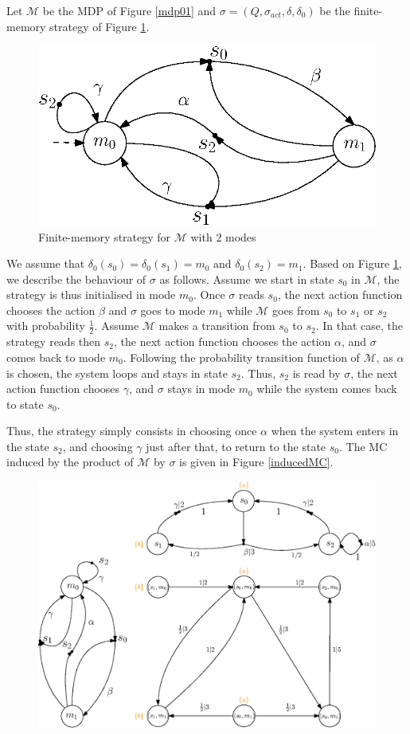 \begin{example}
  Let $\mathcal{M}$ be the MDP of Figure \ref{mdp01} and $\sigma = (Q, \sigma_{act}, \delta, \delta_0)$ be the
  finite-memory strategy of Figure \ref{finite_mem_strat}.
  \begin{figure}[h!]
    \centering
    \includegraphics[width=0.4\linewidth]{resources/strategy}
    \caption{Finite-memory strategy for $\mathcal{M}$ with $2$ modes}\label{finite_mem_strat}
  \end{figure}
  We assume that $\delta_0(s_0) = \delta_0(s_1) = m_0$ and $\delta_0(s_2) = m_1$.
  Based on Figure \ref{finite_mem_strat}, we describe the behaviour of $\sigma$ as follows.
  Assume we start in state $s_0$ in $\mathcal{M}$, the strategy is thus initialised in mode $m_0$.
  Once $\sigma$ reads $s_0$, the next action function chooses the action $\beta$ and $\sigma$ goes to mode $m_1$ while $\mathcal{M}$ goes from $s_0$ to $s_1$ or $s_2$ with probability $\frac{1}{2}$. Assume $\mathcal{M}$ makes a transition from $s_0$ to $s_2$.
  In that case, the strategy reads then $s_2$, the next action function chooses the action $\alpha$, and $\sigma$ comes back to mode $m_0$.
  Following the probability transition function of $\mathcal{M}$, as $\alpha$ is chosen, the system loops and stays in state $s_2$. Thus, $s_2$ is read by $\sigma$, the next action function chooses $\gamma$, and $\sigma$ stays in mode $m_0$ while the system comes back to state $s_0$.
  \par Thus, the strategy simply consists in choosing once $\alpha$ when the system enters in the state $s_2$, and choosing $\gamma$ just after that, to return to the state $s_0$. The MC induced by the product of $\mathcal{M}$ by $\sigma$ is given in Figure
  \ref{inducedMC}.
  \begin{figure}[H]
    \centering
    \includegraphics[width=0.7\linewidth]{resources/inductedmarkov}

\end{figure}
\end{example}
